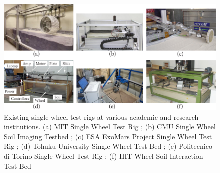 \documentclass{article}
\begin{document}
\begin{figure}[hbt!]
\centering
\includegraphics[width=6.5in]{general-images/existing-test-rigs.pdf}
\caption{Existing single-wheel test rigs at various academic and research institutions. (a) MIT Single Wheel Test Rig \cite{senatore2014modeling}; (b) CMU Single Wheel Soil Imaging Testbed \cite{moreland2012soil}; (c) ESA ExoMars Project Single Wheel Test Rig \cite{gallina2014parameter}; (d) Tohuku University Single Wheel Test Bed \cite{ishigami2008terramechanics}; (e) Politecnico di Torino Single Wheel Test Rig \cite{genta2016testing}; (f) HIT Wheel-Soil Interaction Test Bed \cite{ding2013experimental}}
\label{fig:existing-test-rigs}
\end{figure}
\end{document}
